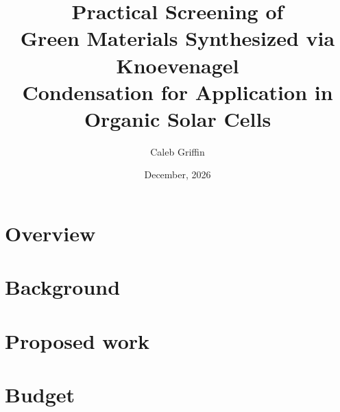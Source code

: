 \documentclass[12pt, letterpaper]{article}
\title{Practical Screening of\\
Green Materials Synthesized via Knoevenagel\\
Condensation for Application in Organic Solar Cells}
\author{Caleb Griffin}
\date{December, 2026}
\begin{document}
\maketitle
\thispagestyle{empty}

\pagebreak
\tableofcontents
\pagebreak

\section{Overview}


\section{Background}


\section{Proposed work}


\clearpage
\printbibliography[
    heading=bibnumbered,
    title={References}
]

\section{Budget}

\end{document}
